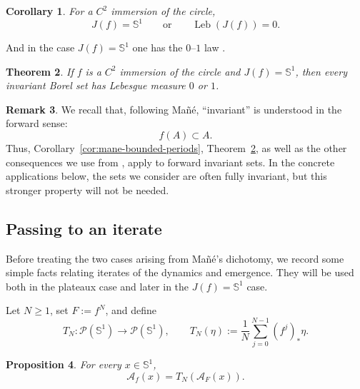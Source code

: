 \documentclass[12pt,a4paper,twoside]{article}
\theoremstyle{plain}
\newtheorem{theorem}{Theorem}[section]
\newtheorem{proposition}[theorem]{Proposition}
\newtheorem{corollary}[theorem]{Corollary}
\theoremstyle{definition}
\newtheorem{remark}[theorem]{Remark}
\newcommand{\cA}{{\mathcal A}}
\newcommand{\cP}{{\mathcal P}}
\newcommand{\Leb}{\operatorname{Leb}}
\newcommand{\Sone}{\mathbb{S}^1}
\begin{document}
\begin{corollary}\label{cor:mane-D}
	For a $C^2$ immersion of the circle,
	\[
	J(f)=\Sone
	\qquad\text{or}\qquad
	\Leb(J(f))=0.
	\]
\end{corollary}

And in the case $J(f)=\Sone$ one has the $0$--$1$ law \cite[Theorem~E]{mane}.

\begin{theorem}\label{thm:mane-E}
	If $f$ is a $C^2$ immersion of the circle and $J(f)=\Sone$, then every invariant Borel set has
	Lebesgue measure $0$ or $1$.
\end{theorem}
	
\begin{remark}\label{rem:mane-forward-invariant}
	We recall that, following Mañé, ``invariant'' is understood in the forward sense:
	\[
	f(A)\subset A.
	\]
	Thus, Corollary~\ref{cor:mane-bounded-periods}, Theorem~\ref{thm:mane-E}, as well as the other consequences we use
from \cite{mane}, apply to forward invariant sets. In the concrete applications below, the sets we consider are often fully invariant, but this stronger property will not be needed.
\end{remark}

\subsection{Passing to an iterate}

Before treating the two cases arising from Mañé's dichotomy, we record
some simple facts relating iterates of the dynamics and emergence.
They will be used both in the plateaux case and later in the
$J(f)=\Sone$ case.

Let \(N\ge1\), set \(F:=f^N\), and define
\[
T_N:\cP(\Sone)\to\cP(\Sone),
\qquad
T_N(\eta):=
\frac1N\sum_{j=0}^{N-1}(f^j)_*\eta.
\]

\begin{proposition}\label{prop:iterate}
For every \(x\in\Sone\),
\[
\cA_f(x)=T_N(\cA_F(x)).
\]
\end{proposition}
\end{document}
